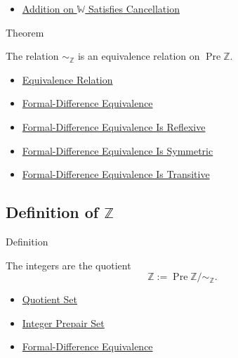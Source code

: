 \begin{dependencies}
\begin{itemize}
  \item \hyperref[thm:addition-on-w-cancellation]{Addition on $\mathbb{W}$ Satisfies Cancellation}
\end{itemize}
\end{dependencies}

\begin{theorembox}{Theorem}
\begin{theorem}
\label{thm:formal-difference-equivalence-relation}
The relation $\sim_{\mathbb{Z}}$ is an equivalence relation on
$\operatorname{Pre}\mathbb{Z}$.
\end{theorem}
\end{theorembox}

\begin{dependencies}
\begin{itemize}
  \item \hyperref[def:equivalence-relation]{Equivalence Relation}
  \item \hyperref[def:formal-difference-equivalence]{Formal-Difference Equivalence}
  \item \hyperref[lem:formal-difference-equivalence-reflexive]{Formal-Difference Equivalence Is Reflexive}
  \item \hyperref[lem:formal-difference-equivalence-symmetric]{Formal-Difference Equivalence Is Symmetric}
  \item \hyperref[lem:formal-difference-equivalence-transitive]{Formal-Difference Equivalence Is Transitive}
\end{itemize}
\end{dependencies}

\subsection*{\texorpdfstring{Definition of $\mathbb{Z}$}{Definition of Z}}

\begin{definitionbox}{Definition}
\begin{definition}[Integers]
\label{def:integers}
The integers are the quotient
\[
\mathbb{Z}:=\operatorname{Pre}\mathbb{Z}/{\sim_{\mathbb{Z}}}.
\]
\end{definition}
\end{definitionbox}

\begin{dependencies}
\begin{itemize}
  \item \hyperref[def:quotient-set]{Quotient Set}
  \item \hyperref[def:integer-prepair-set]{Integer Prepair Set}
  \item \hyperref[def:formal-difference-equivalence]{Formal-Difference Equivalence}
\end{itemize}
\end{dependencies}

